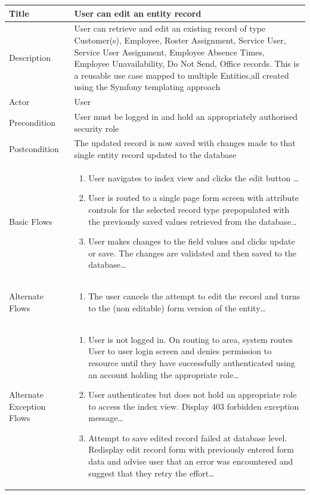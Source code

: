 \documentclass[a4paper,Times New Roman 11pt]{article}
\newcommand\addrow[2]{#1 &#2\\ }
\newcommand\addheading[2]{#1 &#2\\ \hline}
\newcommand\tabularhead{\begin{tabular}{lp{9cm}}
\hline
}
\newcommand\addmulrow[2]{ \begin{minipage}[t][][t]{3cm}#1\end{minipage}%
   &\begin{minipage}[t][][t]{9cm}
    \begin{enumerate} #2   \end{enumerate}
    \end{minipage}\\ }
\newenvironment{usecase}{\tabularhead}
{\hline\end{tabular}}
\begin{document}
\begin{samepage}
\begin{usecase}
    \addheading{Title}{User can edit an entity record }
  \addheading{Description}{User can retrieve and edit an existing record of type Customer(s), Employee, Roster Assignment, Service User, Service User Assignment, Employee Absence Times, Employee Unavailability, Do Not Send, Office records. This is a reusable use case mapped to multiple Entities,all created using the Symfony templating approach}
  \addheading{Actor}{User} 
  \addrow{Precondition}{User must be logged in and hold an appropriately authorised security role}
  \addrow{Postcondition}{The updated record is now saved with changes made to that single entity record updated to the database}
  \addmulrow{Basic Flows}{\item User navigates to index view and clicks the edit button \ldots
                                  \item User is routed to a single page form screen with attribute controls for the selected record type prepopulated with the previously saved values retrieved from the database\ldots
                                  \item User makes changes to the field values and clicks update or save. The changes are validated and then saved to the database\ldots}
  \addmulrow{Alternate  Flows}{\item The user cancels the attempt to edit the record and turns to the (non editable) form version of the entity\ldots}
  \addmulrow{Alternate Exception Flows}{\item User is not logged in. On routing to area, system routes User to user login screen and denies permission to resource until they have successfully authenticated using an account holding the appropriate role\ldots
                                                                      \item User authenticates but does not hold an appropriate role to access the index view. Display 403 forbidden exception message\ldots
                                                                      \item Attempt to save edited record failed at database level. Redisplay edit record form with previously entered form data and advise user that an error was encountered and suggest that they retry the effort\ldots}

\end{usecase}


\end{samepage}
\end{document}
